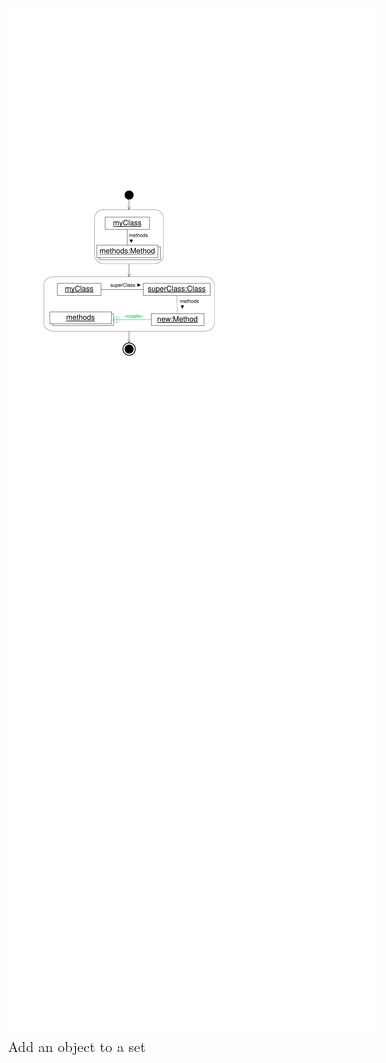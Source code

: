 {\begin{figure}[p]
	\begin{minipage}{.45\textwidth}
		\centering
		\includegraphics[scale=.8]{figures/ReuseObjectSet2}
  	\caption{Add an object to a set}

\end{minipage}
\end{figure}}
